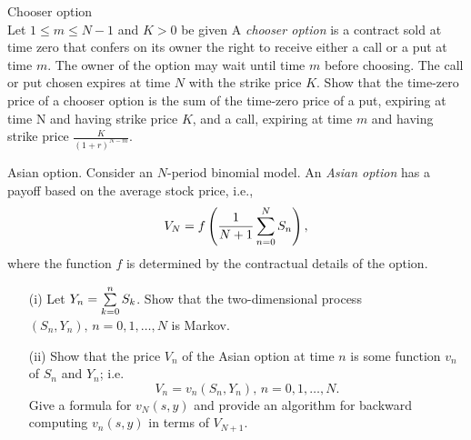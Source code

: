 \begin{problem}
 Chooser option \\
 Let $1\le m\le N-1$ and $K>0$ be given
A \emph{chooser option} is a contract sold at time zero that confers on its owner
the right to receive either a call or a put at time $m$. The owner of the option may
wait until time $m$ before choosing. The call or put chosen expires at time $N$ with
the strike price $K$. Show that the time-zero price of a chooser option is the sum of
the time-zero price of a put, expiring at time N and having strike price $K$, and a call,
expiring at time $m$ and having strike price $\frac{K}{(1+r)^{N-m}}.$
\end{problem} 
\begin{solution} 

\end{solution}

\begin{problem}
Asian option. Consider an $N$-period binomial model.
An \emph{Asian option} has a payoff based on the average stock price, i.e.,
\[
V_N=f\left(\frac{1}{N+1}\sum\limits_{n=0}^{N} S_n \right),
\]
\ni where the function $f$ is determined by the contractual details of the option.
\begin{itemize}
\item[(i)] Let $Y_n=\sum\limits_{k=0}^{n} S_k$. Show that the two-dimensional process
$(S_n,Y_n),\, n=0,1,\dots,N$ is Markov.

\item[(ii)] Show that the price $V_n$ of the Asian option at time $n$
is some function $v_n$ of $S_n$ and $Y_n$; i.e.
\[
V_n=v_n(S_n,Y_n),\, n=0,1,\dots,N.
\]
\ni Give a formula for $v_N(s,y)$ and provide an algorithm for backward computing
$v_n(s,y)$ in terms of $V_{N+1}.$
\end{itemize}

\end{problem} 
\begin{solution} 

\end{solution}

